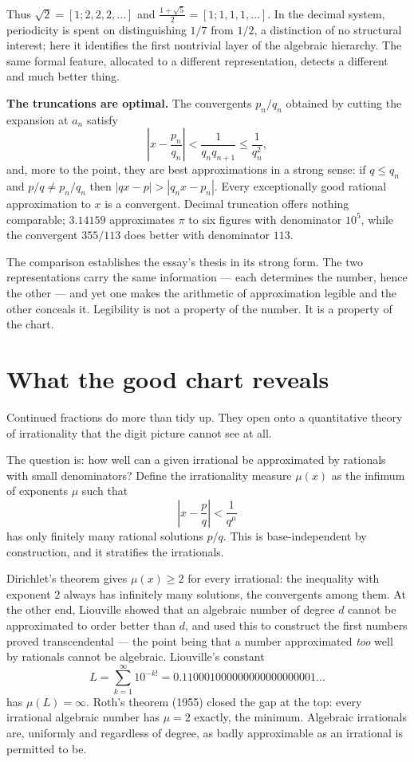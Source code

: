 \documentclass{essay}
\begin{document}
Thus $\sqrt2 = [1;2,2,2,\ldots]$ and
$\tfrac{1+\sqrt5}{2} = [1;1,1,1,\ldots]$. In the decimal system, periodicity is
spent on distinguishing $1/7$ from $1/2$, a distinction of no structural
interest; here it identifies the first nontrivial layer of the algebraic
hierarchy. The same formal feature, allocated to a different representation,
detects a different and much better thing.

\medskip
\noindent\textbf{The truncations are optimal.} The convergents $p_n/q_n$
obtained by cutting the expansion at $a_n$ satisfy
\[
  \left| x - \frac{p_n}{q_n} \right| < \frac{1}{q_n q_{n+1}} \le
  \frac{1}{q_n^2},
\]
and, more to the point, they are best approximations in a strong sense: if
$q \le q_n$ and $p/q \ne p_n/q_n$ then $|qx - p| > |q_n x - p_n|$. Every
exceptionally good rational approximation to $x$ is a convergent. Decimal
truncation offers nothing comparable; $3.14159$ approximates $\pi$ to six
figures with denominator $10^5$, while the convergent $355/113$ does better
with denominator $113$.

The comparison establishes the essay's thesis in its strong form. The two
representations carry the same information --- each determines the number,
hence the other --- and yet one makes the arithmetic of approximation legible
and the other conceals it. Legibility is not a property of the number. It is a
property of the chart.

\section{What the good chart reveals}

Continued fractions do more than tidy up. They open onto a quantitative theory
of irrationality that the digit picture cannot see at all.

The question is: how well can a given irrational be approximated by rationals
with small denominators? Define the irrationality measure $\mu(x)$ as the
infimum of exponents $\mu$ such that
\[
  \left| x - \frac{p}{q} \right| < \frac{1}{q^{\mu}}
\]
has only finitely many rational solutions $p/q$. This is base-independent by
construction, and it stratifies the irrationals.

Dirichlet's theorem gives $\mu(x) \ge 2$ for every irrational: the inequality
with exponent $2$ always has infinitely many solutions, the convergents among
them. At the other end, Liouville showed that an algebraic number of degree $d$
cannot be approximated to order better than $d$, and used this to construct the
first numbers proved transcendental --- the point being that a number
approximated \emph{too} well by rationals cannot be algebraic. Liouville's
constant
\[
  L = \sum_{k=1}^{\infty} 10^{-k!} = 0.110001000000000000000001\ldots
\]
has $\mu(L) = \infty$. Roth's theorem (1955) closed the gap at the top: every
irrational algebraic number has $\mu = 2$ exactly, the minimum. Algebraic
irrationals are, uniformly and regardless of degree, as badly approximable as
an irrational is permitted to be.
\end{document}
